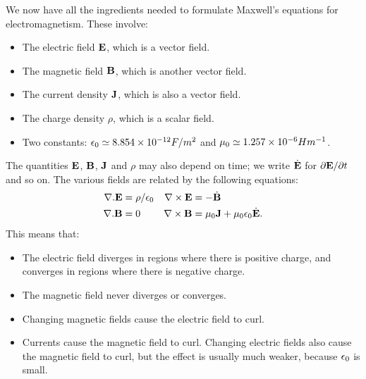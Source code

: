 \documentclass[reqno]{amsart}
\theoremstyle{definition}
\begin{document}
We now have all the ingredients needed to formulate Maxwell's
equations for electromagnetism.  These involve:
\begin{itemize}
 \item The electric field $\mathbf{E}$, which is a vector field.
 \item The magnetic field $\mathbf{B}$, which is another vector field.
 \item The current density $\mathbf{J}$, which is also a vector field.
 \item The charge density $\rho$, which is a scalar field.
 \item Two constants: $\epsilon_0\simeq 8.854\times 10^{-12}F/m^2$ and
  $\mu_0\simeq 1.257\times 10^{-6}Hm^{-1}$.
\end{itemize}
The quantities $\mathbf{E}$, $\mathbf{B}$, $\mathbf{J}$ and $\rho$ may also depend on
time; we write $\dot{\mathbf{E}}$ for $\partial\mathbf{E}/\partial t$ and so on.
The various fields are related by the following equations:
\begin{align*}
 \nabla.\mathbf{E} &= \rho/\epsilon_0 &
 \nabla\times\mathbf{E} &= -\dot{\mathbf{B}} \\ 
 \nabla.\mathbf{B} &= 0 &
 \nabla\times\mathbf{B} &= \mu_0\mathbf{J}+\mu_0\epsilon_0\dot{\mathbf{E}}.
\end{align*}
This means that:
\begin{itemize}
 \item The electric field diverges in regions where there is positive
  charge, and converges in regions where there is negative charge.
 \item The magnetic field never diverges or converges.
 \item Changing magnetic fields cause the electric field to curl.
 \item Currents cause the magnetic field to curl.  Changing electric
  fields also cause the magnetic field to curl, but the effect is
  usually much weaker, because $\epsilon_0$ is small.
\end{itemize}
\end{document}
